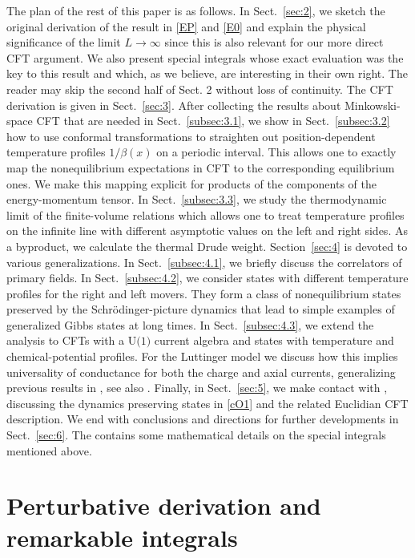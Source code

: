 \documentclass[12pt,a4paper]{article}
\def\nsection#1{\section{#1}\setcounter{equation}{0}}
\theoremstyle{definition}
\theoremstyle{remark}
\begin{document}
The plan of the rest of this paper is as follows.
In Sect.~\ref{sec:2}, we sketch the original derivation of the result in \eqref{EP} and \eqref{E0} and explain the physical significance of the limit $L\to\infty$ since this is also relevant for our more direct CFT argument.
We also present special integrals whose exact evaluation was the key to this result and which, as we believe, are interesting in their own right.
The reader may skip the second half of Sect. 2 without
loss of continuity. The CFT derivation is given in Sect.~\ref{sec:3}.
After collecting the results about Minkowski-space CFT that are needed in Sect.~\ref{subsec:3.1}, we show in Sect.~\ref{subsec:3.2} how
to use conformal transformations to straighten out position-dependent temperature profiles $1/\beta(x)$ on a periodic interval.
This allows one to exactly map the nonequilibrium expectations in CFT to the corresponding equilibrium ones.
We make this mapping explicit for products of the components of the energy-momentum tensor.
In Sect.~\ref{subsec:3.3}, we study the thermodynamic limit of the finite-volume relations which allows one to treat temperature profiles on the infinite line with different asymptotic values on the left and right sides. As a
byproduct, we calculate the thermal Drude weight.   
Section~\ref{sec:4} is devoted to various generalizations.
In Sect.~\ref{subsec:4.1}, we briefly discuss the correlators of primary fields. 
In Sect.~\ref{subsec:4.2}, we consider states with different temperature
profiles for the right and left movers.
They form a class of nonequilibrium states preserved by the Schr\"odinger-picture dynamics that lead to simple examples of generalized Gibbs states
at long times.
In Sect.~\ref{subsec:4.3}, we extend the analysis to CFTs with a $\text{U(1)}$ current algebra and states with temperature and chemical-potential profiles. For the Luttinger model we discuss how this implies universality of conductance for both the charge and axial currents, generalizing previous results in \cite{LLMM1}, see also \cite{MW}. Finally, in Sect.~\ref{sec:5},
we make contact with \cite{DSVC,BD1,DSC,BD2}, discussing the dynamics
preserving states in \eqref{cO1} and the related Euclidian CFT
description. We end with conclusions and directions for further developments
in Sect.~\ref{sec:6}.
The  contains some mathematical details on the special integrals mentioned above.


\nsection{Perturbative derivation and remarkable integrals} 
\label{sec:2}
\end{document}
